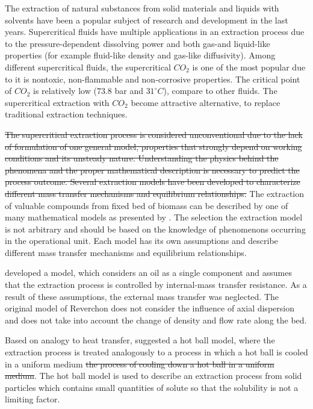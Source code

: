 \documentclass[../Parameter_fitting.tex]{subfiles}
\begin{document}
	
	The extraction of natural substances from solid materials and liquids with solvents have been a popular subject of research and development in the last years. Supercritical fluids have multiple applications in an extraction process due to the pressure-dependent dissolving power and {\color{blue} both gas-and liquid-like properties (for example fluid-like density and gas-like diffusivity). Among different supercritical fluids, the supercritical $CO_2$ is one of the most popular due to it is nontoxic, non-flammable and non-corrosive properties. The critical point of $CO_2$ is relatively low ($73.8$ bar and $31 ^\circ C$), compare to other fluids. The supercritical extraction with $CO_2$ become attractive alternative, to replace traditional extraction techniques.}
	
	\sout{The supercritical extraction process is considered unconventional due to the lack of formulation of one general model, properties that strongly depend on working conditions and its unsteady nature. Understanding the physics behind the phenomena and the proper mathematical description is necessary to predict the process outcome. Several extraction models have been developed to characterize different mass transfer mechanisms and equilibrium relationships.}
	{\color{blue}The extraction of valuable compounds from fixed bed of biomass can be described by one of many mathematical models as presented by \citet{Huang2012}. The selection the extraction model is not arbitrary and should be based on the knowledge of phenomenons occurring in the operational unit. Each model has its own assumptions and describe different mass transfer mechanisms and equilibrium relationships}. 
	
	\citet{Reverchon1996} developed a model, which considers an oil as a single component and assumes that the extraction process is controlled by internal-mass transfer resistance. As a result of these assumptions, the external mass transfer was neglected. The original model of Reverchon does not consider the influence of axial dispersion and does not take into account the change of density and flow rate along the bed. 
	
	Based on analogy to heat transfer, \citet{Reverchon1993} suggested a hot ball model, where the extraction process is treated analogously to {\color{blue} a process in which a hot ball is cooled in a uniform medium} \sout{the process of cooling down a hot ball in a uniform medium}. {\color{blue}The hot ball model is used to describe an extraction process from solid particles which contains small quantities of solute so that the solubility is not a limiting factor. }
	
\end{document}
